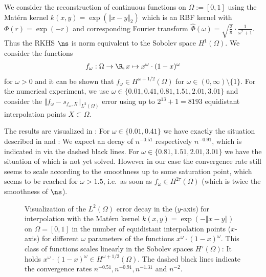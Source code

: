 \documentclass[a4paper, 10pt]{article}
\newlength\fwidth
\begin{document}
\begin{example} %
We consider the reconstruction of continuous functions on $\Omega := [0, 1]$ using the Matérn kernel $k(x, y) = \exp(\Vert x - y \Vert_2)$ which is an RBF kernel with $\Phi(r) = \exp(-r)$ and corresponding Fourier transform $\hat{\Phi}(\omega) = \sqrt{\frac{2}{\pi}} \cdot \frac{1}{\omega^2 + 1}$.
Thus the RKHS $\ns$ is norm equivalent to the Sobolev space $H^1(\Omega)$.
We consider the functions
\begin{align*}
f_\omega: \Omega \rightarrow \R, x \mapsto x^\omega \cdot (1-x)^\omega
\end{align*}
for $\omega > 0$ and it can be shown that $f_\omega \in H^{\omega + 1/2}(\Omega)$ for $\omega \in (0, \infty) \setminus \{ 1 \}$.
%
For the numerical experiment, we use $\omega \in \{ 0.01, 0.41, 0.81, 1.51, 2.01, 3.01 \}$ and consider the $\Vert f_\omega - s_{f_\omega, X} \Vert_{L^2(\Omega)}$ error using up to $2^{13} + 1 = 8193$ equidistant interpolation points $X \subset \Omega$.

The results are visualized in :
For $\omega \in \{ 0.01, 0.41 \}$ we have exactly the situation described in  and : 
We expect an decay of $n^{-0.51}$ respectively $n^{-0.91}$, which is indicated in  via the dashed black lines.
For $\omega \in \{ 0.81, 1.51, 2.01, 3.01 \}$ we have the situation of  which is not yet solved.
However in our case the convergence rate still seems to scale according to the smoothness up to some saturation point,
which seems to be reached for $\omega > 1.5$, i.e.\ as soon as $f_\omega \in H^{2\tau}(\Omega)$ (which is twice the smoothness of $\ns$).


\begin{figure}[hbt!]
\centering
\setlength{}
%
%
	
%
\caption{Visualization of the $L^2(\Omega)$ error decay in the ($y$-axis) for interpolation with the Matérn kernel $k(x, y) = \exp(-\Vert x - y \Vert)$ on $\Omega = [0,1]$ in the number of equidistant interpolation points ($x$-axis) for different $\omega$ parameters of the functions $x^\omega \cdot (1-x)^\omega$.
This class of functions scales linearly in the Sobolev spaces $H^\tau(\Omega)$: 
It holds $x^\omega \cdot (1-x)^\omega \in H^{\omega + 1/2}(\Omega)$.
The dashed black lines indicate the convergence rates $n^{-0.51}, n^{-0.91}, n^{-1.31}$ and $n^{-2}$.}
\label{fig:matern_L2_error}
\end{figure}

\end{example}
\end{document}
